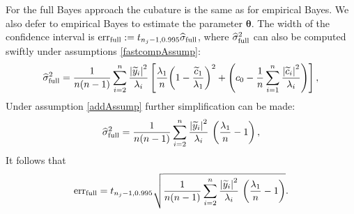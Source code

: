 \documentclass{iitthesis}          %
\newcommand{\bm}[1]{\boldsymbol{#1}}
\newcommand{\vtheta}{{\bm{\theta}}}
\newcommand{\hsigma}{\widehat{\sigma}}
\newcommand{\err}{\textup{err}}
\def\abs#1{\ensuremath{\left \lvert #1 \right \rvert}}
\begin{document}

For the full Bayes approach the cubature is the same as for empirical Bayes.  We also defer to empirical Bayes to estimate the parameter $\vtheta$.  The width of the confidence interval is $\err_{\textup{full}} 
:= t_{n_j-1,0.995} \hsigma_{\textup{full}}$, where $\hsigma_{\textup{full}}^2$ can also be computed swiftly under assumptions \eqref{fastcompAssump}:
\begin{align*} %
\widehat{\sigma}^2_{\textup{full}} =
\frac{1}{n(n-1)} \sum_{i=2}^n \frac{\abs{\widetilde{y}_i}^2}{\lambda_i}
\left[\frac{\lambda_1}{n}{\left(1 - \frac{\widetilde{c}_1}{\lambda_1}\right)^2} + \left(c_0  - \frac 1n \sum_{i=1}^n \frac{\abs{\widetilde{c}_i}^2}{\lambda_i}\right) \right],
\end{align*}
Under assumption \eqref{addAssump} further simplification can be made:
\begin{equation*} %
\widehat{\sigma}^2_{\textup{full}}
=
\frac{1}{n(n-1)} \sum_{i=2}^n \frac{\abs{\widetilde{y}_i}^2}{\lambda_i} \, \left(\frac{\lambda_1}{n}  - 1  \right),
\end{equation*}
It follows that
\begin{equation*} %
\err_{\textup{full}}
=
t_{n_j-1,0.995}
\sqrt{\frac{1}{n(n-1)} \sum_{i=2}^n \frac{\abs{\widetilde{y}_i}^2}{\lambda_i} \, \left(\frac{\lambda_1}{n}  - 1  \right)}.
\end{equation*}


\end{document}
